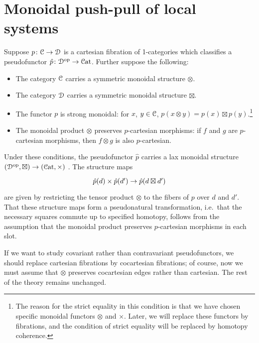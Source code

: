 \documentclass[main.tex]{subfiles}
\begin{document}
\section{Monoidal push-pull of local systems}
\label{sec:the_monoidal_construction}

Suppose $p\colon \mathcal{C} \to \mathcal{D}$ is a cartesian fibration of 1-categories which classifies a pseudofunctor $\hat{p}\colon \mathcal{D}^{\mathrm{op}} \to \mathcal{C}\mathrm{at}$. Further suppose the following:
\begin{itemize}
  \item The category $\mathcal{C}$ carries a symmetric monoidal structure $\otimes$.

  \item The category $\mathcal{D}$ carries a symmetric monoidal structure $\boxtimes$.

  \item The functor $p$ is strong monoidal: for $x$, $y \in \mathcal{C}$, $p(x \otimes y) = p(x) \boxtimes p(y)$.\footnote{The reason for the strict equality in this condition is that we have chosen specific monoidal functors $\otimes$ and $\times$. Later, we will replace these functors by fibrations, and the condition of strict equality will be replaced by homotopy coherence.}

  \item The monoidal product $\otimes$ preserves $p$-cartesian morphisms: if $f$ and $g$ are $p$-cartesian morphisms, then $f \otimes g$ is also $p$-cartesian.
\end{itemize}
Under these conditions, the pseudofunctor $\hat{p}$ carries a lax monoidal structure $(\mathcal{D}^{\mathrm{op}}, \boxtimes) \to (\mathcal{C}\mathrm{at}, \times)$ \cite{moeller2018monoidal}. The structure maps
\begin{equation*}
  \begin{tikzcd}
    \hat{p}(d) \times \hat{p}(d') \to \hat{p}(d \boxtimes d')
  \end{tikzcd}
\end{equation*}
are given by restricting the tensor product $\otimes$ to the fibers of $p$ over $d$ and $d'$. That these structure maps form a pseudonatural transformation, i.e.\ that the necessary squares commute up to specified homotopy, follows from the assumption that the monoidal product preserves $p$-cartesian morphisms in each slot.

If we want to study covariant rather than contravariant pseudofunctors, we should replace cartesian fibrations by cocartesian fibrations; of course, now we must assume that $\otimes$ preserves cocartesian edges rather than cartesian. The rest of the theory remains unchanged.
\end{document}

